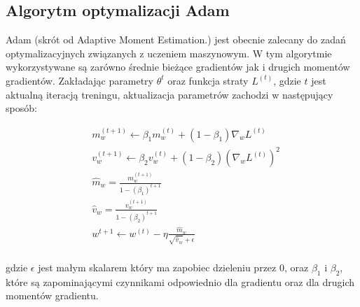 \subsection{Algorytm optymalizacji Adam}
Adam (skrót od Adaptive Moment Estimation.) jest obecnie zalecany do zadań optymalizacyjnych związanych z uczeniem maszynowym.
W tym algorytmie wykorzystywane są zarówno średnie bieżące gradientów jak i drugich momentów gradientów.
Zakładając parametry $\theta^{t}$ oraz funkcja straty $L^{(t)}$, gdzie $t$ jest aktualną iteracją treningu, 
aktualizacja parametrów zachodzi w następujący sposób:

\begin{align*}
  &m_w^{(t+1)} \leftarrow \beta_{1}m_w^{(t)} + (1 - \beta_1)\nabla_wL^{(t)} \\
  &v_w^{(t+1)} \leftarrow \beta_{2}v_w^{(t)} + (1 - \beta_2)(\nabla_wL^{(t)})^2 \\
  &\hat m_w = \frac{m_w^{(t+1)}}{1 - (\beta_1)^{t+1}} \\
  &\hat v_w = \frac{v_w^{(t+1)}}{1 - (\beta_2)^{t+1}} \\
  &w^{t+1} \leftarrow w^{(t)} -  \eta \frac{\hat m_w}{\sqrt{\hat v_w} + \epsilon} \\
\end{align*}

gdzie $\epsilon$ jest małym skalarem który ma zapobiec dzieleniu przez $0$, 
oraz $\beta _{1}$ i $\beta_{2}$, które są zapominającymi czynnikami odpowiednio dla gradientu oraz dla 
drugich momentów gradientu.
